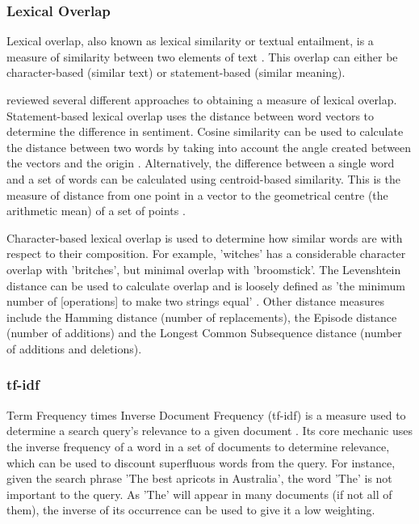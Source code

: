 \subsubsection{Lexical Overlap}
Lexical overlap, also known as lexical similarity or textual entailment, is a measure of similarity between two elements of text \cite{adams2006}. This overlap can either be character-based (similar text) or statement-based (similar meaning).

 reviewed several different approaches to obtaining a measure of lexical overlap. Statement-based lexical overlap uses the distance between word vectors to determine the difference in sentiment. Cosine similarity can be used to calculate the distance between two words by taking into account the angle created between the vectors and the origin \cite{qian2004}. Alternatively, the difference between a single word and a set of words can be calculated using centroid-based similarity. This is the measure of distance from one point in a vector to the geometrical centre (the arithmetic mean) of a set of points \cite{Awrejcewicz2012}.  

Character-based lexical overlap is used to determine how similar words are with respect to their composition. For example, 'witches' has a considerable character overlap with 'britches', but minimal overlap with 'broomstick'. The Levenshtein distance can be used to calculate overlap and is loosely defined as 'the minimum number of [operations] to make two strings equal' \cite{navarro2001guided}. Other distance measures include the Hamming distance (number of replacements), the Episode distance (number of additions) and the Longest Common Subsequence distance (number of additions and deletions). 



\subsubsection{tf-idf}\label{lit:tfidf}
Term Frequency times Inverse Document Frequency (tf-idf) is a measure used to determine a search query's relevance to a given document \cite{Rajaraman2011}. Its core mechanic uses the inverse frequency of a word in a set of documents to determine relevance, which can be used to discount superfluous words from the query. For instance, given the search phrase 'The best apricots in Australia', the word 'The' is not important to the query. As 'The' will appear in many documents (if not all of them), the inverse of its occurrence can be used to give it a low weighting. 

